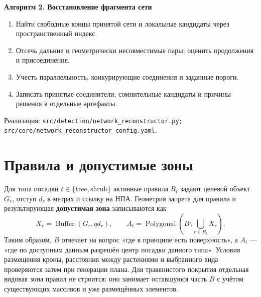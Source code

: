 \documentclass[11pt,a4paper]{article}
\newcommand{\src}[1]{\par{\small\color{muted}Реализация: \texttt{#1}.}\par}
\newcommand{\alg}[1]{\medskip\noindent\colorbox{pale}{\parbox{\dimexpr\linewidth-2\fboxsep}{\textbf{#1}}}\smallskip}
\begin{document}
\alg{Алгоритм 2. Восстановление фрагмента сети}
\begin{enumerate}
\item Найти свободные концы принятой сети и локальные кандидаты через пространственный индекс.
\item Отсечь дальние и геометрически несовместимые пары; оценить продолжения и присоединения.
\item Учесть параллельность, конкурирующие соединения и заданные пороги.
\item Записать принятые соединители, сомнительные кандидаты и причины решения в отдельные артефакты.
\end{enumerate}
\src{src/detection/network\_reconstructor.py;\\ src/core/network\_reconstructor\_config.yaml}

\section{Правила и допустимые зоны}
Для типа посадки $t\in\{\mathrm{tree},\mathrm{shrub}\}$ активные правила $R_t$ задают целевой объект $G_r$, отступ $d_r$ в метрах и ссылку на НПА. Геометрия запрета для правила и результирующая \textbf{допустимая зона} записываются как
\begin{equation}
X_r=\operatorname{Buffer}(G_r,q d_r),\qquad
A_t=\operatorname{Polygonal}\left(B\setminus\bigcup_{r\in R_t}X_r\right).
\end{equation}
Таким образом, $B$ отвечает на вопрос «где в принципе есть поверхность», а $A_t$ --- «где по доступным данным разрешён центр посадки данного типа». Условия размещения кроны, расстояния между растениями и выбранного вида проверяются затем при генерации плана. Для травянистого покрытия отдельная видовая зона правил не строится: оно занимает оставшуюся часть $B$ с учётом существующих массивов и уже размещённых элементов.
\end{document}
